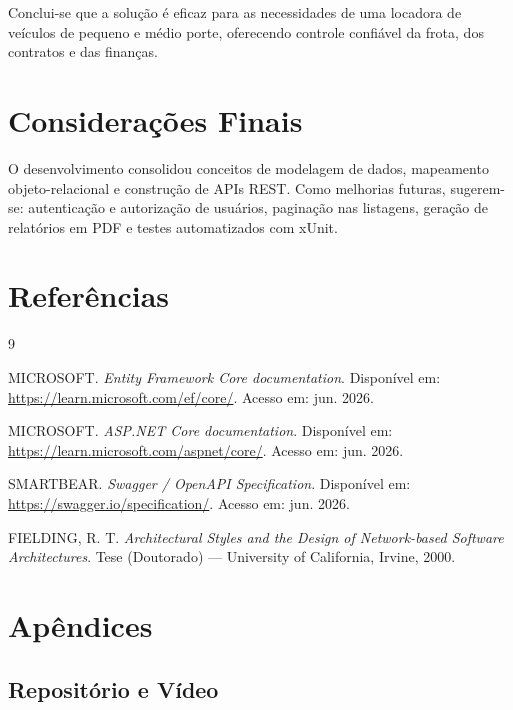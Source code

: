 \documentclass[12pt]{article}
\begin{document}
Conclui-se que a solução é eficaz para as necessidades de uma locadora de veículos de pequeno e médio porte, oferecendo controle confiável da frota, dos contratos e das finanças.

\section{Considerações Finais}

O desenvolvimento consolidou conceitos de modelagem de dados, mapeamento objeto-relacional e construção de APIs REST. Como melhorias futuras, sugerem-se: autenticação e autorização de usuários, paginação nas listagens, geração de relatórios em PDF e testes automatizados com xUnit.

\section{Referências}

\begin{thebibliography}{9}

 MICROSOFT. \emph{Entity Framework Core documentation}. Disponível em: \url{https://learn.microsoft.com/ef/core/}. Acesso em: jun. 2026.

 MICROSOFT. \emph{ASP.NET Core documentation}. Disponível em: \url{https://learn.microsoft.com/aspnet/core/}. Acesso em: jun. 2026.

 SMARTBEAR. \emph{Swagger / OpenAPI Specification}. Disponível em: \url{https://swagger.io/specification/}. Acesso em: jun. 2026.

 FIELDING, R. T. \emph{Architectural Styles and the Design of Network-based Software Architectures}. Tese (Doutorado) --- University of California, Irvine, 2000.

\end{thebibliography}

\section{Apêndices}

\subsection{Repositório e Vídeo}
\end{document}

